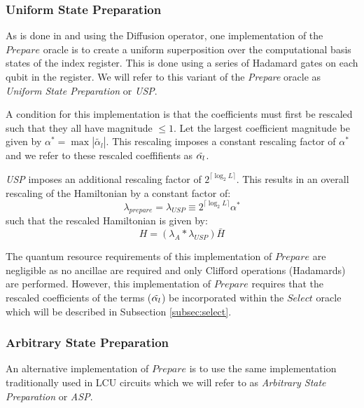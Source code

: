 \subsubsection{Uniform State Preparation}
\label{subsubsec:usp}

As is done in \cite{camps2024explicit} and \cite{liu2024efficient} using the Diffusion operator, one implementation of the $\textit{Prepare}$ oracle is to create a uniform superposition over the computational basis states of the index register.
This is done using a series of Hadamard gates on each qubit in the register.
We will refer to this variant of the \textit{Prepare} oracle as \textit{Uniform State Preparation} or \textit{USP}.

A condition for this implementation is that the coefficients must first be rescaled such that they all have magnitude $\leq 1$.
Let the largest coefficient magnitude be given by $\alpha^* = \max{|\tilde{\alpha_l}|}$.
This rescaling imposes a constant rescaling factor of $\alpha^*$ and we refer to these rescaled coeffifients as $\Tilde{\alpha_l}$.

\textit{USP} imposes an additional rescaling factor of $2^{\lceil \log_2{L} \rceil}$.
This results in an overall rescaling of the Hamiltonian by a constant factor of:
\begin{equation}
    \label{eq:usp-rescaling}
    \lambda_{prepare} = \lambda_{USP} \equiv 2^{\lceil \log_2{L} \rceil} \alpha^*
\end{equation}
such that the rescaled Hamiltonian is given by:
\begin{equation}
    \label{Hbar scale}
    H = (\lambda_A * \lambda_{USP}) \bar{H}
\end{equation}

The quantum resource requirements of this implementation of $\textit{Prepare}$ are negligible as no ancillae are required and only Clifford operations (Hadamards) are performed.
However, this implementation of $\textit{Prepare}$ requires that the rescaled coefficients of the terms ($\Tilde{\alpha_l}$) be incorporated within the $\textit{Select}$ oracle which will be described in Subsection \ref{subsec:select}.

\subsubsection{Arbitrary State Preparation}
\label{subsubsec:asp}

An alternative implementation of $\textit{Prepare}$ is to use the same implementation traditionally used in LCU circuits which we will refer to as \textit{Arbitrary State Preparation} or \textit{ASP}.

